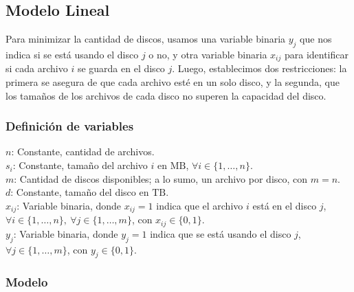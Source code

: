 \documentclass[11pt, a4paper, pdftex]{article}
\begin{document}
\subsection{Modelo Lineal}\label{modelo:primera:parte}

Para minimizar la cantidad de discos, usamos una variable binaria
$y_{j}$ que nos indica si se está usando el disco $j$ o no, y otra
variable binaria $x_{ij}$ para identificar si cada archivo $i$ se guarda
en el disco $j$. Luego, establecimos dos restricciones: la primera se
asegura de que cada archivo esté en un solo disco, y la segunda, que los
tamaños de los archivos de cada disco no superen la capacidad del disco.

\newpage
\subsubsection{Definición de variables}

\noindent $n$: Constante, cantidad de archivos. \\

\noindent $s_{i}$: Constante, tamaño del archivo $i$ en $\text{MB}$, $\forall i \in \{1, \ldots, n\}$. \\

\noindent $m$: Cantidad de discos disponibles; a lo sumo, un archivo por disco, con $m = n$. \\

\noindent $d$: Constante, tamaño del disco en $\text{TB}$. \\ 

\noindent $x_{ij}$: Variable binaria, donde $x_{ij} = 1$ indica que el archivo $i$ está en el disco $j$, $\forall i \in \{1, \ldots, n\},\ \forall j \in \{1, \ldots, m\}$, con $x_{ij} \in \{0, 1\}$. \\

\noindent $y_{j}$: Variable binaria, donde $y_{j} = 1$ indica que se está usando el disco $j$, $\forall j \in \{1, \ldots, m\}$, con $y_{j} \in \{0, 1\}$. \\


\subsubsection{Modelo}
\end{document}
